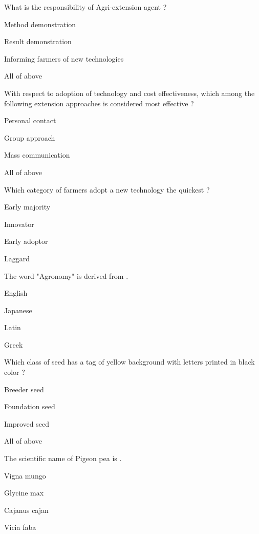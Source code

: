 \begin{questions}
\question What is the responsibility of Agri-extension agent ?
  \begin{items}
  \item Method demonstration
  \item Result demonstration
  \item Informing farmers of new technologies
  \item* All of above
  \end{items}

\question With respect to adoption of technology and cost effectiveness, which among the following extension approaches is considered most effective ?
  \begin{items}
  \item Personal contact
  \item* Group approach
  \item Mass communication
  \item All of above
  \end{items}

\question Which category of farmers adopt a new technology the quickest ?
  \begin{items}
  \item Early majority
  \item* Innovator
  \item Early adoptor
  \item Laggard
  \end{items}

\question The word "Agronomy" is derived from \fillin[][3cm].
  \begin{items}
  \item English
  \item Japanese
  \item Latin
  \item* Greek
  \end{items}

\question Which class of seed has a tag of yellow background with letters printed in black color ?
  \begin{items}
  \item Breeder seed
  \item Foundation seed
  \item* Improved seed
  \item All of above
  \end{items}

\question The scientific name of Pigeon pea is \fillin[][3cm].
  \begin{items}
  \item Vigna mungo
  \item Glycine max
  \item* Cajanus cajan
  \item Vicia faba
  \end{items}


\end{questions}
